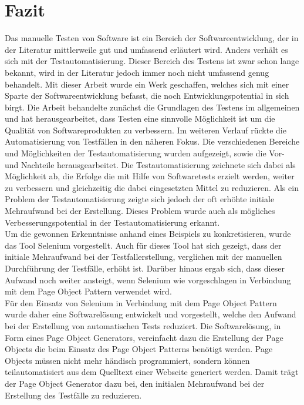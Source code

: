 \chapter{Fazit}
\label{sec:fazit}
Das manuelle Testen von Software ist ein Bereich der Softwareentwicklung, der in der Literatur mittlerweile gut und umfassend erläutert wird. Anders verhält es sich mit der Testautomatisierung. Dieser Bereich des Testens ist zwar schon lange bekannt, wird in der Literatur jedoch immer noch nicht umfassend genug behandelt. Mit dieser Arbeit wurde ein Werk geschaffen, welches sich mit einer Sparte der Softwareentwicklung befasst, die noch Entwicklungspotential in sich birgt. 
Die Arbeit behandelte zunächst die Grundlagen des Testens im allgemeinen und hat herausgearbeitet, dass Testen eine sinnvolle Möglichkeit ist um die Qualität von Softwareprodukten zu verbessern. 
Im weiteren Verlauf rückte die Automatisierung von Testfällen in den näheren Fokus. Die verschiedenen Bereiche und Möglichkeiten der Testautomatisierung wurden aufgezeigt, sowie die Vor- und Nachteile herausgearbeitet.
Die Testautomatisierung zeichnete sich dabei als Möglichkeit ab, die Erfolge die mit Hilfe von Softwaretests erzielt werden, weiter zu verbessern und gleichzeitig die dabei eingesetzten Mittel zu reduzieren. Als ein Problem der Testautomatisierung zeigte sich jedoch der oft erhöhte initiale Mehraufwand bei der Erstellung. Dieses Problem wurde auch als mögliches Verbesserungspotential in der Testautomatisierung erkannt.\\
Um die gewonnen Erkenntnisse anhand eines Beispiels zu konkretisieren, wurde das Tool Selenium vorgestellt.
Auch für dieses Tool hat sich gezeigt, dass der initiale Mehraufwand bei der Testfallerstellung, verglichen mit der manuellen Durchführung der Testfälle, erhöht ist. Darüber hinaus ergab sich, dass dieser Aufwand noch weiter ansteigt, wenn Selenium wie vorgeschlagen in Verbindung mit dem Page Object Pattern verwendet wird.\\
Für den Einsatz von Selenium in Verbindung mit dem Page Object Pattern wurde daher eine Softwarelösung entwickelt und vorgestellt, welche den Aufwand bei der Erstellung von automatischen Tests reduziert.
Die Softwarelösung, in Form eines Page Object Generators, vereinfacht dazu die Erstellung der Page Objects die beim Einsatz des Page Object Patterns benötigt werden. Page Objects müssen nicht mehr händisch programmiert, sondern können teilautomatisiert aus dem Quelltext einer Webseite generiert werden. Damit trägt der Page Object Generator dazu bei, den initialen Mehraufwand bei der Erstellung des Testfälle zu reduzieren.

